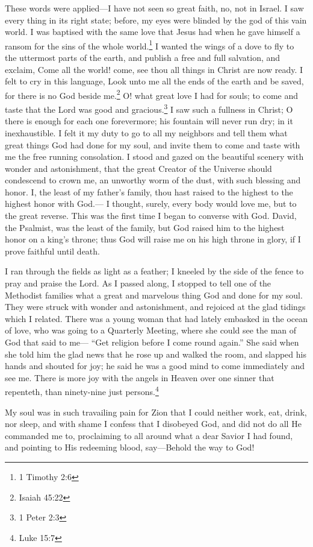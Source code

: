 These words were applied---I have not seen so great faith, no, not in Israel.
I saw every thing in its right state; before, my eyes were blinded by the god of this vain world.
I was baptised with the same love that Jesus had when he gave himself a ransom for the sins of the whole world.\footnote{1 Timothy 2:6}
I wanted the wings of a dove to fly to the uttermost parts of the earth, and publish a free and full salvation, and exclaim, Come all the world! come, see thou all things in Christ are now ready.
I felt to cry in this language, Look unto me all the ends of the earth and be saved, for there is no God beside me.\footnote{Isaiah 45:22}
O! what great love I had for souls; to come and taste that the Lord was good and gracious.\footnote{1 Peter 2:3}
I saw such a fullness in Christ; O there is enough for each one forevermore; his fountain will never run dry; in it inexhaustible.
I felt it my duty to go to all my neighbors and tell them what great things God had done for my soul, and invite them to come and taste with me the free running consolation.
I stood and gazed on the beautiful scenery with wonder and astonishment, that the great Creator of the Universe should condescend to crown me, an unworthy worm of the dust, with such blessing and honor.
I, the least of my father's family, thou hast raised to the highest to the highest honor with God.---%
I thought, surely, every body would love me, but to the great reverse.
This was the first time I began to converse with God.
David, the Psalmist, was the least of the family, but God raised him to the highest honor on a king's throne; thus God will raise me on his high throne in glory, if I prove faithful until death.

I ran through the fields as light as a feather; I kneeled by the side of the fence to pray and praise the Lord.
As I passed along, I stopped to tell one of the Methodist families what a great and marvelous thing God and done for my soul.
They were struck with wonder and astonishment, and rejoiced at the glad tidings which I related.
There was a young woman that had lately embasked in the ocean of love, who was going to a Quarterly Meeting, where she could see the man of God that said to me---%
\markpage%
``Get religion before I come round again.''
She said when she told him the glad news that he rose up and walked the room, and slapped his hands and shouted for joy; he said he was a good mind to come immediately and see me.
There is more joy with the angels in Heaven over one sinner that repenteth, than ninety-nine just persons.\footnote{Luke 15:7}

My soul was in such travailing pain for Zion that I could neither work, eat, drink, nor sleep, and with shame I confess that I disobeyed God, and did not do all He commanded me to, proclaiming to all around what a dear Savior I had found, and pointing to His redeeming blood, say---Behold the way to God!